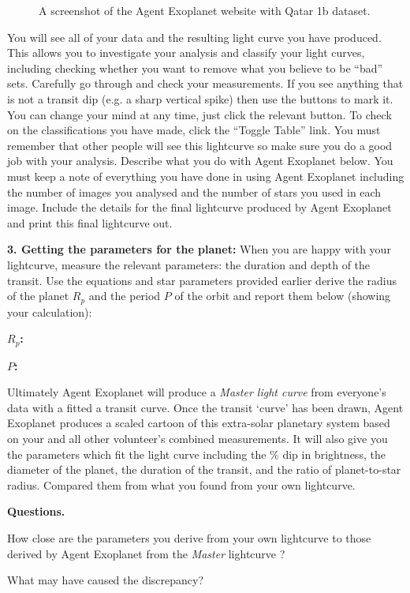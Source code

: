 \begin{figure*}[h]
        \centerline{}
        \caption{A screenshot of the Agent Exoplanet website with Qatar 1b dataset.}\label{AE}
\end{figure*}

You will see all of your data and the resulting light curve you have
produced. This allows you to investigate your analysis and classify
your light curves, including checking whether you want to remove what
you believe to be ``bad'' sets. Carefully go through and check your
measurements. If you see anything that is not a transit dip (e.g. a
sharp vertical spike) then use the buttons to mark it. You can change 
your mind at any time, just click the relevant button. To check on the
classifications you have made, click the ``Toggle Table'' link. You
must remember that other people will see this lightcurve so make sure
you do a good job with your analysis.  Describe what you do with Agent
Exoplanet below. You must keep a note of everything you have done in
using Agent Exoplanet including the number of images you analysed and
the number of stars you used in each image. Include the details for
the final lightcurve produced by Agent Exoplanet and print this final
lightcurve out.

\clearpage

\noindent
{\bf 3. Getting the parameters for the planet:} When you are happy
with your lightcurve, measure the relevant parameters: the duration
and depth of the transit. Use the equations and star parameters
provided earlier derive the radius of the planet $R_p$ and the period
$P$ of the orbit and report them below (showing your calculation):

\bigskip

\medskip\noindent 
{\bf$R_p$:}
\vspace{30pt}

\medskip\noindent 
{\bf$P$:}
\vspace{60pt}

Ultimately Agent Exoplanet will produce a \emph{Master light curve}
from everyone’s data with a fitted a transit curve. Once the transit
‘curve’ has been drawn, Agent Exoplanet produces a scaled cartoon of
this extra-solar planetary system based on your and all other
volunteer’s combined measurements. It will also give you the
parameters which fit the light curve including the \% dip in
brightness, the diameter of the planet, the duration of the transit,
and the ratio of planet-to-star radius. Compared them from what you
found from your own lightcurve.

\medskip\noindent
{\bf Questions.}

\medskip\noindent How close are the parameters you derive from your 
own lightcurve to those derived by Agent Exoplanet from
the \emph{Master} lightcurve ?

\medskip\noindent What may have caused the discrepancy?


